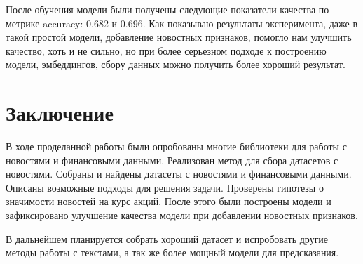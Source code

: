 \documentclass{article}
\begin{document}
После обучения модели были получены следующие показатели качества по метрике accuracy: 0.682 и 0.696. Как показываю результаты эксперимента, даже в такой простой модели, добавление новостных признаков, помогло нам улучшить качество, хоть и не сильно, но при более серьезном подходе к построению модели, эмбеддингов, сбору данных можно получить более хороший результат.

\section{Заключение}

В ходе проделанной работы были опробованы многие библиотеки для работы с новостями и финансовыми данными. Реализован метод для сбора датасетов с новостями. Собраны и найдены датасеты с новостями и финансовыми данными. Описаны возможные подходы для решения задачи. Проверены гипотезы о значимости новостей на курс акций. После этого были построены модели и зафиксировано улучшение качества модели при добавлении новостных признаков.

В дальнейшем планируется собрать хороший датасет и испробовать другие методы работы с текстами, а так же более мощный модели для предсказания.




\begin{thebibliography}{3}
\cite{https://link.springer.com/article/10.1007/s42001-019-00035-x}
\cite{https://arxiv.org/abs/0809.2792}
\cite{https://econpapers.repec.org/article/gamjecomi/v_3a8_3ay_3a2020_3ai_3a4_3ap_3a107-_3ad_3a457822.htm}
\cite{https://www.mdpi.com/2227-7099/8/4/107/htm}
\cite{https://www.diva-portal.org/smash/get/diva2:1637576/FULLTEXT01.pdf}
\cite{http://statistica.ru/theory/t-kriterii/}
\cite{https://github.com/topics/cnbc-api}
\cite{https://huggingface.co/cardiffnlp/twitter-roberta-base-sentiment}
\cite{https://www.kaggle.com/datasets/lorilaz/apple-news-headline-sentiment-and-stock-info}

\end{thebibliography}


\end{document}
